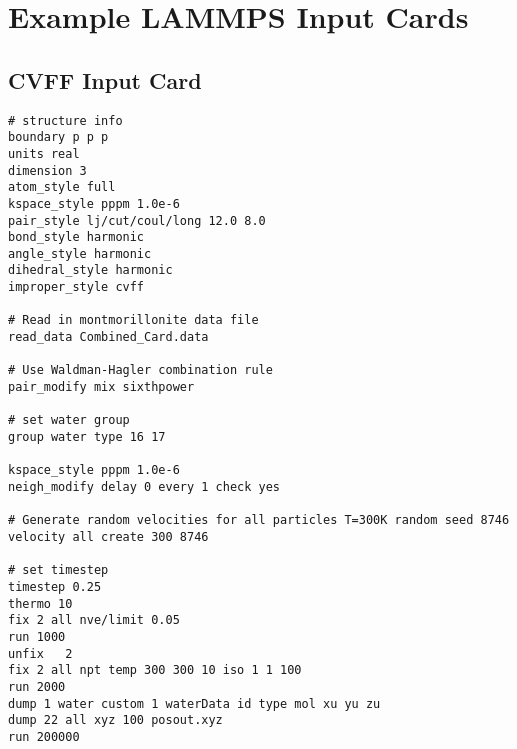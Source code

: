  
\appendix    %
\chapter{Example LAMMPS Input Cards}

\section{CVFF Input Card}
\label{appendix:cvff}
\begin{singlespace}
\begin{verbatim}
# structure info
boundary p p p
units real
dimension 3
atom_style full
kspace_style pppm 1.0e-6
pair_style lj/cut/coul/long 12.0 8.0
bond_style harmonic
angle_style harmonic
dihedral_style harmonic
improper_style cvff

# Read in montmorillonite data file
read_data Combined_Card.data

# Use Waldman-Hagler combination rule
pair_modify mix sixthpower

# set water group
group water type 16 17

kspace_style pppm 1.0e-6
neigh_modify delay 0 every 1 check yes

# Generate random velocities for all particles T=300K random seed 8746
velocity all create 300 8746

# set timestep
timestep 0.25
thermo 10
fix 2 all nve/limit 0.05
run 1000
unfix	2
fix 2 all npt temp 300 300 10 iso 1 1 100
run 2000
dump 1 water custom 1 waterData id type mol xu yu zu
dump 22 all xyz 100 posout.xyz
run 200000
\end{verbatim}
\end{singlespace}

